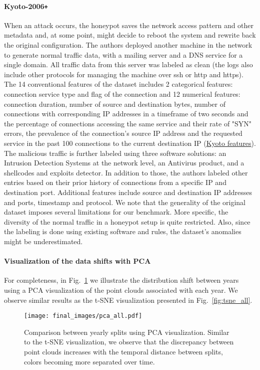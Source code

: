 \documentclass{article}
\begin{document}
\paragraph{Kyoto-2006\texttt{+}} When an attack occurs, the honeypot saves the network access pattern and other metadata and, at some point, might decide to reboot the system and rewrite back the original configuration. The authors deployed another machine in the network to generate normal traffic data, with a mailing server and a DNS service for a single domain. All traffic data from this server was labeled as clean (the logs also include other protocols for managing the machine over ssh or http and https). The 14 conventional features of the dataset includes 2 categorical features: connection service type and flag of the connection and 12 numerical features: connection duration, number of source and destination bytes, number of connections with corresponding IP addresses in a timeframe of two seconds and the percentage of connections accessing the same service and their rate of "SYN" errors, the prevalence of the connection's source IP address and the requested service in the past 100 connections to the current destination IP (\href{http://www.takakura.com/Kyoto_data/BenchmarkData-Description-New.pdf}{Kyoto features}). The malicious traffic is further labeled using three software solutions: an Intrusion Detection Systems at the network level, an Antivirus product, and a shellcodes and exploits detector. In addition to those, the authors labeled other entries based on their prior history of connections from a specific IP and destination port. Additional features include source and destination IP addresses and ports, timestamp and protocol. We note that the generality of the original dataset imposes several limitations for our benchmark. More specific, the diversity of the normal traffic in a honeypot setup is quite restricted. Also, since the labeling is done using existing software and rules, the dataset's anomalies might be underestimated.

\paragraph{Visualization of the data shifts with PCA} For completeness, in Fig.~\ref{fig:pca_all} we illustrate the distribution shift between years using a PCA visualization of the point clouds associated with each year. We observe similar results as the t-SNE visualization presented in Fig.~\ref{fig:tsne_all}. 

\begin{figure}[t]
    \begin{center}
         \texttt{[image: final\_images/pca\_all.pdf]}
    \end{center}
    \caption{Comparison between yearly splits using PCA visualization. Similar to the t-SNE visualization, we observe that the discrepancy between point clouds increases with the temporal distance between splits, colors becoming more separated over time.}
    \label{fig:pca_all}
    \vspace{-1em}
\end{figure}
\end{document}
